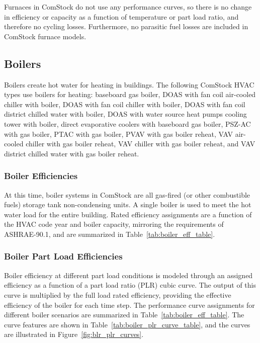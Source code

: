 Furnaces in ComStock do not use any performance curves, so there is no change in efficiency or capacity as a function of temperature or part load ratio, and therefore no cycling losses. Furthermore, no parasitic fuel losses are included in ComStock furnace models.



\subsection{Boilers}

Boilers create hot water for heating in buildings. The following ComStock HVAC types use boilers for heating: baseboard gas boiler, DOAS with fan coil air-cooled chiller with boiler, DOAS with fan coil chiller with boiler, DOAS with fan coil district chilled water with boiler, DOAS with water source heat pumps cooling tower with boiler, direct evaporative coolers with baseboard gas boiler, PSZ-AC with gas boiler, PTAC with gas boiler, PVAV with gas boiler reheat, VAV air-cooled chiller with gas boiler reheat, VAV chiller with gas boiler reheat, and VAV district chilled water with gas boiler reheat.

\subsubsection{Boiler Efficiencies}
At this time, boiler systems in ComStock are all gas-fired (or other combustible fuels) storage tank non-condensing units. A single boiler is used to meet the hot water load for the entire building. Rated efficiency assignments are a function of the HVAC code year and boiler capacity, mirroring the requirements of ASHRAE-90.1, and are summarized in Table~\ref{tab:boiler_eff_table}.

\subsubsection{Boiler Part Load Efficiencies}
Boiler efficiency at different part load conditions is modeled through an assigned efficiency as a function of a part load ratio (PLR) cubic curve. The output of this curve is multiplied by the full load rated efficiency, providing the effective efficiency of the boiler for each time step. The performance curve assignments for different boiler scenarios are summarized in Table~\ref{tab:boiler_eff_table}. The curve features are shown in Table~\ref{tab:boiler_plr_curve_table}, and the curves are illustrated in Figure~\ref{fig:blr_plr_curves}.

